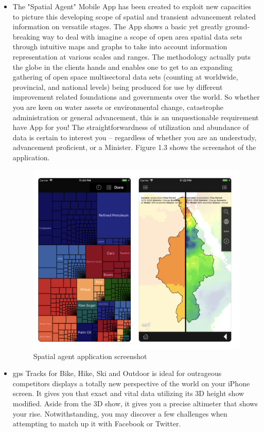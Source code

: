 \begin{itemize}
  
  \item The "Spatial Agent" Mobile App has been created to exploit new capacities to picture this developing scope of spatial and transient advancement related information on versatile stages. The App shows a basic yet greatly ground-breaking way to deal with imagine a scope of open area spatial data sets through intuitive maps and graphs to take into account information representation at various scales and ranges. The methodology actually puts the globe in the clients hands and enables one to get to an expanding gathering of open space multisectoral data sets (counting at worldwide, provincial, and national levels) being produced for use by different improvement related foundations and governments over the world. So whether you are keen on water assets or environmental change, catastrophe administration or general advancement, this is an unquestionable requirement have App for you! The straightforwardness of utilization and abundance of data is certain to interest you – regardless of whether you are an understudy, advancement proficient, or a Minister. Figure 1.3 shows the screenshot of the application.
  
  
  
  \begin{figure}[H]
            \centering
            \includegraphics[width=0.5\linewidth]{figures/ch1/spatial_agent.png}
            \caption{\label{fig:spatial_agent} Spatial agent application screenshot}
    \end{figure}
  
  \item \gls{gps} Tracks for Bike, Hike, Ski and Outdoor is ideal for outrageous competitors displays a totally new perspective of the world on your iPhone screen. It gives you that exact and vital data utilizing its 3D height show modified. Aside from the 3D show, it gives you a precise altimeter that shows your rise. Notwithstanding, you may discover a few challenges when attempting to match up it with Facebook or Twitter.
  

\end{itemize}
